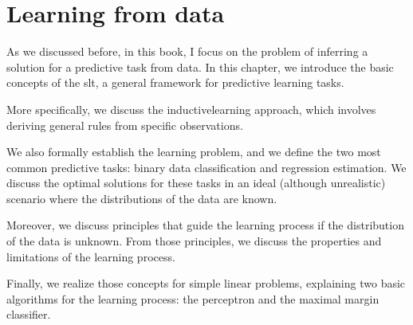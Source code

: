 \chapter{Learning from data}
\label{chap:slt}
\glsresetall


As we discussed before, in this book, I focus on the problem of inferring a solution for a
predictive task from data.  In this chapter, we introduce the basic concepts of the
\gls{slt}, a general framework for predictive learning tasks.

More specifically, we discuss the \gls{inductivelearning} approach, which involves
deriving general rules from specific observations.

We also formally establish the learning problem, and we define the two most common
predictive tasks: binary data classification and regression estimation.  We discuss the
optimal solutions for these tasks in an ideal (although unrealistic) scenario where the
distributions of the data are known.

Moreover, we discuss principles that guide the learning process if the distribution of
the data is unknown.  From those principles, we discuss the properties and limitations of
the learning process.

Finally, we realize those concepts for simple linear problems, explaining two basic
algorithms for the learning process: the perceptron and the maximal margin classifier.

